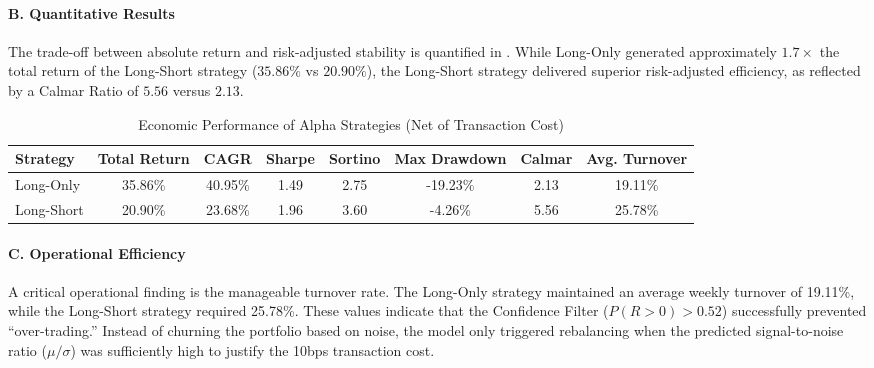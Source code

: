 \documentclass[twoside,final]{hcmut-report}
\newcommand{\result}[1]{\fcolorbox{red}{white}{#1}}
\begin{document}
\paragraph{B. Quantitative Results}
The trade-off between absolute return and risk-adjusted stability is quantified in \result{Table~\ref{tab:backtest_metrics}}. While Long-Only generated approximately $1.7\times$ the total return of the Long-Short strategy ($35.86\%$ vs $20.90\%$), the Long-Short strategy delivered superior risk-adjusted efficiency, as reflected by a Calmar Ratio of $5.56$ versus $2.13$.
\begin{table}[H]
  \hspace*{-1.5cm}
  \begin{minipage}{\textwidth}
    \raggedright
    \renewcommand{\arraystretch}{1.1}
    \setlength{\tabcolsep}{5pt}
    \hspace*{1.5cm}\caption{Economic Performance of Alpha Strategies (Net of Transaction Cost)}
    \label{tab:backtest_metrics}
    \begin{tabular}{lccccccc}
      \toprule
      \textbf{Strategy} & \textbf{Total Return} & \textbf{CAGR}   & \textbf{Sharpe}        &
      \textbf{Sortino}  & \textbf{Max Drawdown} & \textbf{Calmar} & \textbf{Avg. Turnover}                                    \\
      \midrule
      Long-Only         & 35.86\%               & 40.95\%         & 1.49                   & 2.75 & -19.23\% & 2.13 & 19.11\% \\
      Long-Short        & 20.90\%               & 23.68\%         & 1.96                   & 3.60 & -4.26\%  & 5.56 & 25.78\% \\
      \bottomrule
    \end{tabular}
  \end{minipage}
\end{table}

\paragraph{C. Operational Efficiency}
A critical operational finding is the manageable turnover rate. The Long-Only strategy maintained an average weekly turnover of 19.11\%, while the Long-Short strategy required 25.78\%. These values indicate that the Confidence Filter ($P(R>0)>0.52$) successfully prevented ``over-trading.'' Instead of churning the portfolio based on noise, the model only triggered rebalancing when the predicted signal-to-noise ratio ($\mu/\sigma$) was sufficiently high to justify the 10bps transaction cost.
\end{document}

